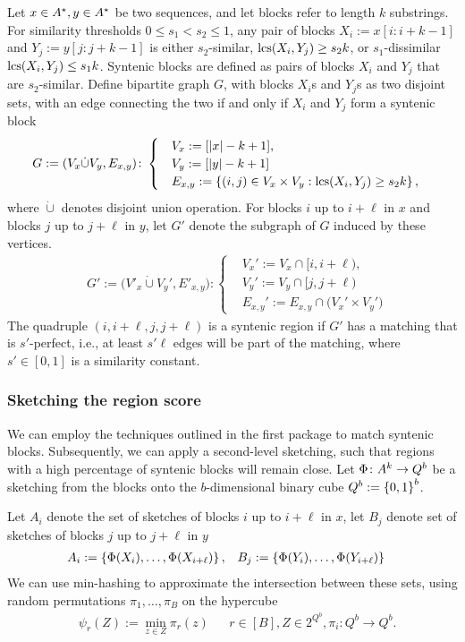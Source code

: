 Let $x\in A^\star, y\in A^\star$ be two sequences, and let blocks refer to length $k$ substrings. For similarity thresholds $0\le s_1 < s_2\le 1$, any pair of blocks $X_i:=x[i:i+k-1]$ and $Y_j:=y[j:j+k-1]$ is either $s_2$-similar, $\operatorname{\mathrm{lcs}}(X_i,Y_j)\ge s_2 k$, or $s_1$-dissimilar $\operatorname{\mathrm{lcs}}(X_i,Y_j)\le s_1 k$. Syntenic blocks are defined as pairs of blocks $X_i$ and $Y_j$ that are $s_2$-similar. Define bipartite graph $G$, with blocks $X_i$s and $Y_j$s as two disjoint sets, with an edge connecting the two if and only if $X_i$ and $Y_j$ form a syntenic block
\begin{align}
&G := (V_x\dot\cup V_y, E_{x,y}) \colon 
\begin{cases}
&V_x:=[|x|-k+1], \\
&V_y:=[|y|-k+1]\\
& E_{x,y}:=\left\{(i,j)\in V_x\times V_y: \operatorname{\mathrm{lcs}}(X_i, Y_j)\ge s_2 k\right\}, 
\end{cases} 
\end{align}
where $\dot\cup$ denotes disjoint union operation. For blocks $i$ up to $i+\ell$ in $x$ and blocks $j$ up to $j+\ell$ in $y$, let $G'$ denote the subgraph of $G$ induced by these vertices. 
\begin{align}
&G':=\Big(V'_x\dot\cup V_y', E'_{x,y}\Big) \colon \begin{cases}
 &V_x':=V_x\cap [i,i+\ell), \\
 &V_y':=V_y\cap [j,j+\ell) \\
 &E_{x,y}':= E_{x,y} \cap \big(V_x'\times V_y'\big)
 \end{cases}
\end{align}
 The quadruple $(i,i+\ell, j, j+\ell)$ is a syntenic region if $G'$ has a matching that is $s'$-perfect, i.e., at least  $s' \ell$ edges will be part of the matching, where $s'\in[0,1]$ is a similarity constant. 


\subsubsection*{Sketching the region score}
We can employ the techniques outlined in the first package to match syntenic blocks. Subsequently, we can apply a second-level sketching, such that regions with a high percentage of syntenic blocks will remain close. Let $\Phi\colon A^k\to Q^b$ be a sketching from the blocks onto the $b$-dimensional binary cube $Q^b:=\left\{0,1\right\}^b$. 

Let $A_i$ denote the set of sketches of blocks $i$ up to $i+\ell$ in $x$, let $B_j$ denote set of sketches of blocks $j$ up to $j+\ell$ in $y$
\begin{align}
    &A_i:=\left\{\Phi(X_i),\dots,\Phi(X_{i+\ell})\right\},
    &&B_j:=\left\{\Phi(Y_i),\dots,\Phi(Y_{i+\ell})\right\}
\end{align}
We can use min-hashing to approximate the intersection between these sets, using random permutations $\pi_1,\dots, \pi_B$ on the hypercube 
\begin{align}
    &\psi_r(Z):=\min_{z\in Z} \pi_r(z)  && r\in[B], Z\in 2^{Q^b}, \pi_i\colon Q^b\to Q^b.
\end{align}

